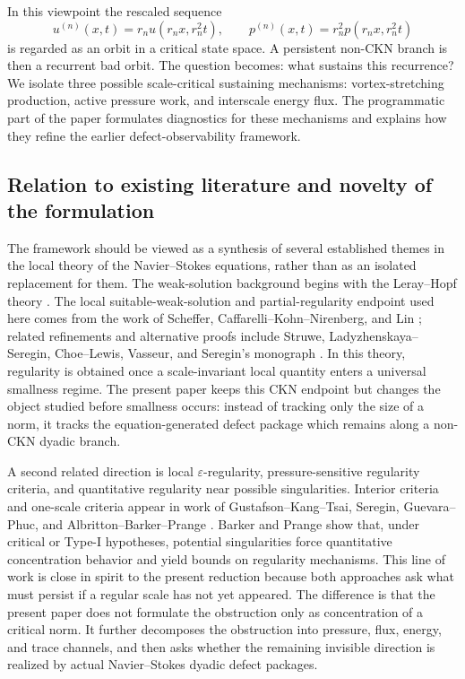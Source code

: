 \documentclass[11pt]{article}
\numberwithin{equation}{section}
\theoremstyle{plain}
\theoremstyle{definition}
\theoremstyle{remark}
\begin{document}
In this viewpoint the rescaled sequence
\[
    u^{(n)}(x,t)=r_nu(r_nx,r_n^2t),
    \qquad
    p^{(n)}(x,t)=r_n^2p(r_nx,r_n^2t)
\]
is regarded as an orbit in a critical state space.  A persistent non-CKN branch is then a recurrent bad orbit.  The question becomes: what sustains this recurrence?  We isolate three possible scale-critical sustaining mechanisms: vortex-stretching production, active pressure work, and interscale energy flux.  The programmatic part of the paper formulates diagnostics for these mechanisms and explains how they refine the earlier defect-observability framework.

\subsection{Relation to existing literature and novelty of the formulation}
\label{subsec:related-work}

The framework should be viewed as a synthesis of several established themes in the local theory of the Navier--Stokes equations, rather than as an isolated replacement for them.  The weak-solution background begins with the Leray--Hopf theory \cite{Leray1934,Hopf1951}.  The local suitable-weak-solution and partial-regularity endpoint used here comes from the work of Scheffer, Caffarelli--Kohn--Nirenberg, and Lin \cite{Scheffer1976,Scheffer1977,CKN1982,Lin1998}; related refinements and alternative proofs include Struwe, Ladyzhenskaya--Seregin, Choe--Lewis, Vasseur, and Seregin's monograph \cite{Struwe1988,LadyzhenskayaSeregin1999,ChoeLewis2000,Vasseur2007,Seregin2015}.  In this theory, regularity is obtained once a scale-invariant local quantity enters a universal smallness regime.  The present paper keeps this CKN endpoint but changes the object studied before smallness occurs: instead of tracking only the size of a norm, it tracks the equation-generated defect package which remains along a non-CKN dyadic branch.

A second related direction is local \(\varepsilon\)-regularity, pressure-sensitive regularity criteria, and quantitative regularity near possible singularities.  Interior criteria and one-scale criteria appear in work of Gustafson--Kang--Tsai, Seregin, Guevara--Phuc, and Albritton--Barker--Prange \cite{GustafsonKangTsai2007,Seregin2007Local,GuevaraPhuc2017,AlbrittonBarkerPrange2023}.  Barker and Prange \cite{BarkerPrange2021} show that, under critical or Type-I hypotheses, potential singularities force quantitative concentration behavior and yield bounds on regularity mechanisms.  This line of work is close in spirit to the present reduction because both approaches ask what must persist if a regular scale has not yet appeared.  The difference is that the present paper does not formulate the obstruction only as concentration of a critical norm.  It further decomposes the obstruction into pressure, flux, energy, and trace channels, and then asks whether the remaining invisible direction is realized by actual Navier--Stokes dyadic defect packages.
\end{document}
